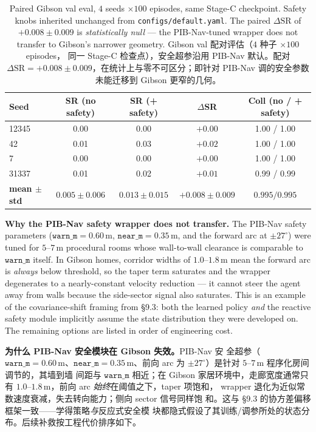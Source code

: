 \documentclass[11pt,a4paper]{article}
\newcommand{\en}[1]{\par\noindent #1\par\vspace{0.15em}}
\newcommand{\zh}[1]{\par\noindent\color{zhcol}\hspace{0.5em}#1\par\color{black}\vspace{0.6em}}
\begin{document}
\begin{table}[H]
\centering\small
\caption{Paired Gibson val eval, $4$ seeds $\times 100$ episodes, same
Stage-C checkpoint. Safety knobs inherited unchanged from
\texttt{configs/default.yaml}. The paired $\Delta\mathrm{SR}$ of
$+0.008 \pm 0.009$ is \emph{statistically null} — the PIB-Nav-tuned
wrapper does not transfer to Gibson's narrower geometry.
\textsf{\small Gibson val 配对评估（$4$ 种子 $\times 100$ episodes，
同一 Stage-C 检查点），安全超参沿用 PIB-Nav 默认。配对
$\Delta\mathrm{SR} = +0.008 \pm 0.009$，在统计上与零不可区分；即针对
PIB-Nav 调的安全参数未能迁移到 Gibson 更窄的几何。}}
\label{tab:gibson-eval}
\begin{tabular}{lcccc}
\toprule
Seed & SR (no safety) & SR (+ safety) & $\Delta$SR & Coll (no / + safety) \\
\midrule
12345       & 0.00 & 0.00 & $+0.00$ & 1.00 / 1.00 \\
42          & 0.01 & 0.03 & $+0.02$ & 1.00 / 1.00 \\
7           & 0.00 & 0.00 & $+0.00$ & 1.00 / 1.00 \\
31337       & 0.01 & 0.02 & $+0.01$ & 0.99 / 0.99 \\
\midrule
\textbf{mean $\pm$ std} & $0.005\pm 0.006$ & $0.013\pm 0.015$ & $\mathbf{+0.008\pm 0.009}$ & $0.995/0.995$ \\
\bottomrule
\end{tabular}
\end{table}

\en{\textbf{Why the PIB-Nav safety wrapper does not transfer.}
The PIB-Nav safety parameters
($\mathtt{warn\_m}=0.60\,$m, $\mathtt{near\_m}=0.35\,$m, and the forward
arc at $\pm 27^\circ$) were tuned for $5$–$7\,$m procedural rooms whose
wall-to-wall clearance is comparable to $\mathtt{warn\_m}$ itself. In
Gibson homes, corridor widths of $1.0$–$1.8\,$m mean the forward arc is
\emph{always} below threshold, so the taper term saturates and the
wrapper degenerates to a nearly-constant velocity reduction — it cannot
steer the agent away from walls because the side-sector signal also
saturates. This is an example of the covariance-shift framing from
\S9.3: both the learned policy \emph{and} the reactive safety module
implicitly assume the state distribution they were developed on. The
remaining options are listed in order of engineering cost.}

\zh{\textsf{\textbf{为什么 PIB-Nav 安全模块在 Gibson 失效。}PIB-Nav 安
全超参（$\mathtt{warn\_m}=0.60\,$m、$\mathtt{near\_m}=0.35\,$m、前向
arc 为 $\pm 27^\circ$）是针对 $5$–$7\,$m 程序化房间调节的，其墙到墙
间距与 $\mathtt{warn\_m}$ 相近；在 Gibson 家居环境中，走廊宽度通常只
有 $1.0$–$1.8\,$m，前向 arc \emph{始终}在阈值之下，taper 项饱和，
wrapper 退化为近似常数速度衰减，失去转向能力；侧向 sector 信号同样饱
和。这与 \S9.3 的协方差偏移框架一致——学得策略\emph{与}反应式安全模
块都隐式假设了其训练/调参所处的状态分布。后续补救按工程代价排序如下。}}
\end{document}
